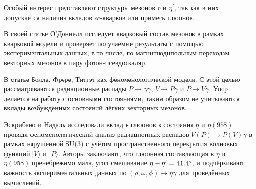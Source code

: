 
Особый интерес представляют структуры мезонов $\eta$ и $\eta^\prime$, так как в них допускается наличия вкладов $c\bar{c}$-кварков или примесь глюонов. 

В своей статье О'Доннелл \cite{ODonnell:1981sj} исследует кварковый состав мезонов в
рамках кварковой модели и проверяет получаемые результаты с помощью
экспериментальных данных, в то числе, по магнитнодипольным переходам
векторных мезонов в пару фотон-псевдоскаляр.

В статье Болла, Фрере, Титгэт \cite{Ball:1995zv} ках феноменологической модели.%
С этой целью рассматриваются радиационные распады
$P \to \gamma \gamma$, $V \to P \gamma$ и $P \to V \gamma$. Упор
делается на работу с основными состояниями, таким образом не учитываются
вклады возбуждённых состояний лёгких векторных мезонов.

Эскрибано и Надаль \cite{Escribano:2007cd} исследовали вклад в глюонов в состояния $\eta$
и $\eta(958)$ провядя феноменологический анализ радиационных распадов
$V (P) \to P (V) \gamma$ в рамках нарушенной SU(3) с учётом
пространственного перекрытия волновых функций $| V \rangle$ и
$|P \rangle$. Авторы заключают, что глюонная составляющая в $\eta$ и
$\eta(958)$ пренебрежимо мала, угол смешивание
$\eta-\eta^\prime = \ang{41.4 \pm 1.3}$, и подчёркивают важность
экспериментальных данных по $(\rho, \omega, \phi ) \to \eta \gamma$ для
проведённых вычислений.

